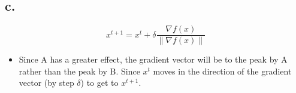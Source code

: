 \documentclass[11pt]{article}
\begin{document}
\subsection*{c.}
\label{sec:orgaca900a}
\begin{equation}
x^{t+1} = x^t + \delta \frac{\nabla f(x)}{\|\nabla f(x) \|}
\end{equation}

\begin{itemize}
\item Since A has a greater effect, the gradient vector will be to the peak by A
rather than the peak by B. Since \(x^t\) moves in the direction of the
gradient vector (by step \(\delta\)) to get to \(x^{t+1}\).
\end{itemize}
\end{document}
